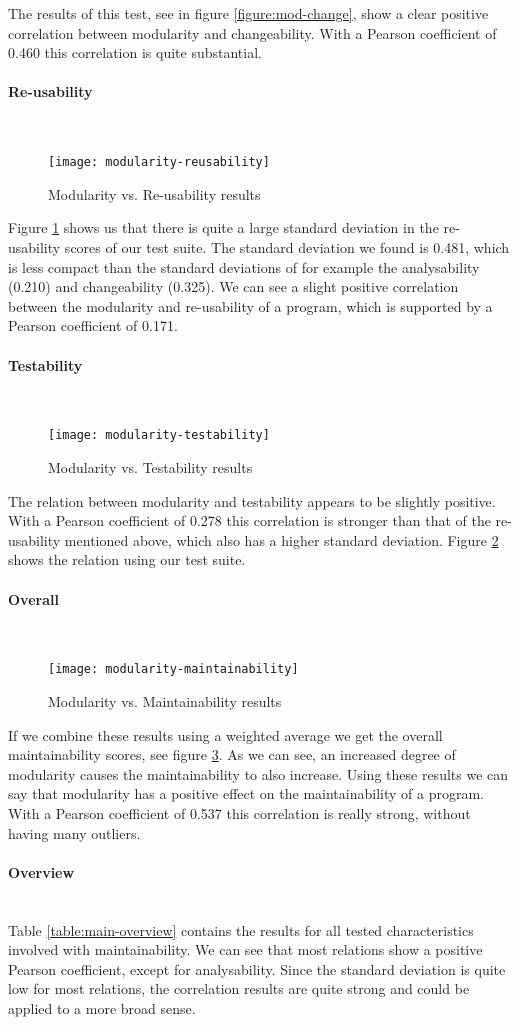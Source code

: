 \documentclass[twoside]{uva-inf-bachelor-thesis}
\newcommand{\myparagraph}[1]{\paragraph{#1}\mbox{}\\}
\begin{document}
The results of this test, see in figure \ref{figure:mod-change}, show a clear positive correlation between modularity and changeability. With a Pearson coefficient of 0.460 this correlation is quite substantial. 

\myparagraph{Re-usability}
\begin{figure}[H]
    \caption{Modularity vs. Re-usability results}
    \label{figure:mod-reuse}
    \centering
        \texttt{[image: modularity-reusability]}
\end{figure}

Figure \ref{figure:mod-reuse} shows us that there is quite a large standard deviation in the re-usability scores of our test suite. The standard deviation we found is 0.481, which is less compact than the standard deviations of for example the analysability (0.210) and changeability (0.325). We can see a slight positive correlation between the modularity and re-usability of a program, which is supported by a Pearson coefficient of 0.171.

\myparagraph{Testability}
\begin{figure}[H]
    \caption{Modularity vs. Testability results}
    \label{figure:mod-test}
    \centering
        \texttt{[image: modularity-testability]}
\end{figure}

The relation between modularity and testability appears to be slightly positive. With a Pearson coefficient of 0.278 this correlation is stronger than that of the re-usability mentioned above, which also has a higher standard deviation. Figure \ref{figure:mod-test} shows the relation using our test suite.

\myparagraph{Overall}
\begin{figure}[H]
    \caption{Modularity vs. Maintainability results}
    \label{figure:mod-main}
    \centering
        \texttt{[image: modularity-maintainability]}
\end{figure}

If we combine these results using a weighted average we get the overall maintainability scores, see figure \ref{figure:mod-main}. As we can see, an increased degree of modularity causes the maintainability to also increase. Using these results we can say that modularity has a positive effect on the maintainability of a program. With a Pearson coefficient of 0.537 this correlation is really strong, without having many outliers.

\myparagraph{Overview}
Table \ref{table:main-overview} contains the results for all tested characteristics involved with maintainability. We can see that most relations show a positive Pearson coefficient, except for analysability. Since the standard deviation is quite low for most relations, the correlation results are quite strong and could be applied to a more broad sense.
\end{document}
